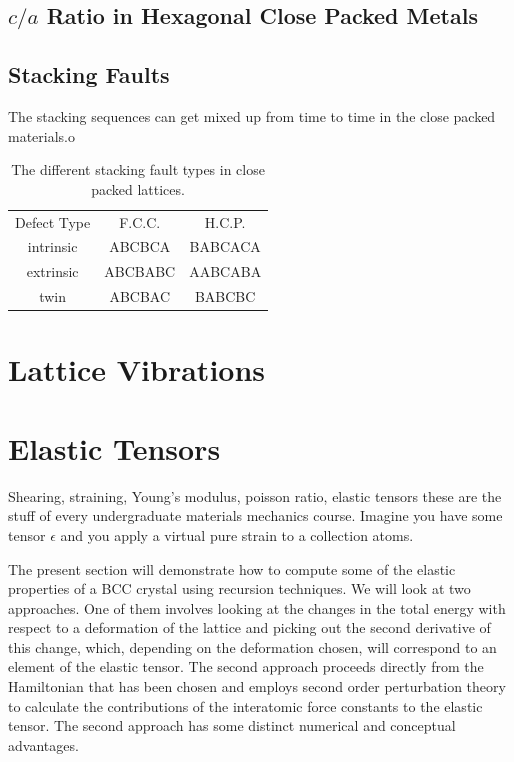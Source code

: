 
\subsection{$c/a$ Ratio in Hexagonal Close Packed Metals}

\subsection{Stacking Faults}
%
The stacking sequences can get mixed up from time to time
in the close packed materials.o
%
\begin{table}
\begin{tabular}{c c c}
Defect Type  &  F.C.C.     &  H.C.P.  \\
intrinsic  &  ABCBCA     &  BABCACA   \\  
extrinsic  &  ABCBABC    &  AABCABA  \\ 
twin       &  ABCBAC     &  BABCBC   \\
\end{tabular}
\caption{The different stacking fault types in close packed lattices.\label{tab:stackingfaults}}
\end{table}

\section{Lattice Vibrations}

\section{Elastic Tensors}
Shearing, straining, Young's modulus, poisson ratio, elastic tensors these are the
stuff of every undergraduate materials mechanics course.
Imagine you have some tensor $\epsilon$ and you apply a virtual pure strain to a collection atoms.

The present section will demonstrate how to compute some of the elastic properties
of a BCC crystal using recursion techniques. We will look at two approaches.
One of them involves looking at the changes in the total energy with
respect to a deformation of the lattice and picking out the 
second derivative of this change, which, depending on the deformation chosen,
will correspond to an element of the elastic tensor. The second approach
proceeds directly from the Hamiltonian that has been chosen and employs second order
perturbation theory to calculate the contributions of
the interatomic force constants to the elastic tensor. 
The second approach has some distinct numerical 
and conceptual advantages.

